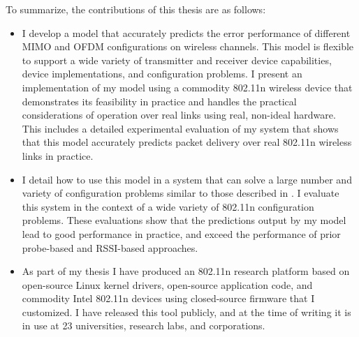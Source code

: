 To summarize, the contributions of this thesis are as follows:
\begin{itemize}[leftmargin=0.5cm,parsep=1ex,itemsep=1ex,topsep=1ex]
\item I develop a model that accurately predicts the error performance of different MIMO and OFDM configurations on wireless channels. This model is flexible to support a wide variety of transmitter and receiver device capabilities, device implementations, and configuration problems. I present an implementation of my model using a commodity 802.11n wireless device that demonstrates its feasibility in practice and handles the practical considerations of operation over real links using real, non-ideal hardware. This includes a detailed experimental evaluation of my system that shows that this model accurately predicts packet delivery over real 802.11n wireless links in practice.

\item I detail how to use this model in a system that can solve a large number and variety of configuration problems similar to those described in . I evaluate this system in the context of a wide variety of 802.11n configuration problems.
These evaluations show that the predictions output by my model lead to good performance in practice, and exceed the performance of prior probe-based and RSSI-based approaches.

\item As part of my thesis I have produced an 802.11n research platform based on open-source Linux kernel drivers, open-source application code, and commodity Intel 802.11n devices using closed-source firmware that I customized.
I have released this tool publicly, and at the time of writing it is in use at 23 universities, research labs, and corporations.
\end{itemize}


